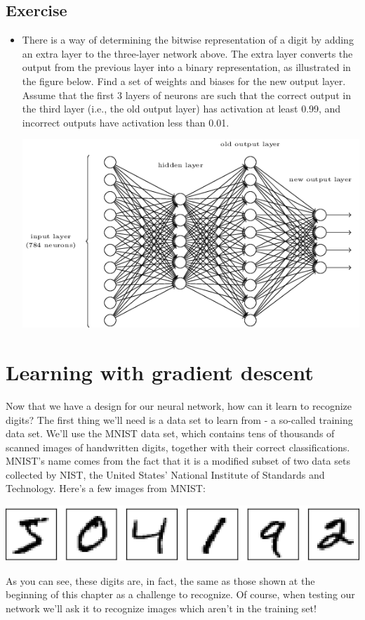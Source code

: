 \documentclass[a4paper,twoside,10pt]{book}
\begin{document}
\subsection*{Exercise}
\begin{itemize}
	\item There is a way of determining the bitwise representation of a digit by adding an extra layer to the three-layer network above. The extra layer converts the output from the previous layer into a binary representation, as illustrated in the figure below. Find a set of weights and biases for the new output layer. Assume that the first 3 layers of neurons are such that the correct output in the third layer (i.e., the old output layer) has activation at least 0.99, and incorrect outputs have activation less than 0.01.
	\begin{center}
		\includegraphics[width=\linewidth]{./figures/ch1/tikz13}
	\end{center}
\end{itemize}


\section{Learning with gradient descent}
Now that we have a design for our neural network, how can it learn to recognize digits? The first thing we'll need is a data set to learn from - a so-called training data set. We'll use the MNIST data set, which contains tens of thousands of scanned images of handwritten digits, together with their correct classifications. MNIST's name comes from the fact that it is a modified subset of two data sets collected by NIST, the United States' National Institute of Standards and Technology. Here's a few images from MNIST:
\begin{center}
	\includegraphics[scale=0.65]{./figures/ch1/digits_separate}
\end{center}
As you can see, these digits are, in fact, the same as those shown at the beginning of this chapter as a challenge to recognize. Of course, when testing our network we'll ask it to recognize images which aren't in the training set!
\end{document}
